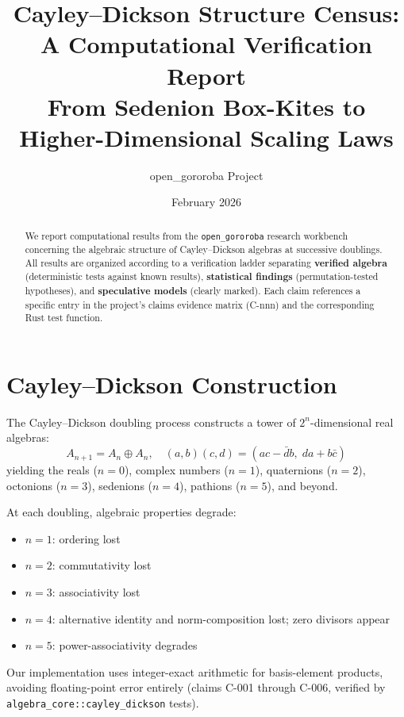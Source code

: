 \documentclass{article}
\title{\textbf{Cayley--Dickson Structure Census: \\
A Computational Verification Report}\\[0.5em]
\large From Sedenion Box-Kites to Higher-Dimensional Scaling Laws}
\author{open\_gororoba Project}
\date{February 2026}
\theoremstyle{definition}
\theoremstyle{plain}
\theoremstyle{remark}
\begin{document}
\maketitle

\begin{abstract}
We report computational results from the \texttt{open\_gororoba} research
workbench concerning the algebraic structure of Cayley--Dickson algebras at
successive doublings.  All results are organized according to a verification
ladder separating \textbf{verified algebra} (deterministic tests against known
results), \textbf{statistical findings} (permutation-tested hypotheses), and
\textbf{speculative models} (clearly marked).  Each claim references a specific
entry in the project's claims evidence matrix (C-nnn) and the corresponding
Rust test function.
\end{abstract}

\tableofcontents
\newpage

\section{Cayley--Dickson Construction}
\label{sec:cd}

The Cayley--Dickson doubling process \cite{baez2002} constructs a tower of
$2^n$-dimensional real algebras:
\begin{equation}
  A_{n+1} = A_n \oplus A_n, \quad
  (a,b)(c,d) = (ac - \bar{d}b,\; da + b\bar{c})
\end{equation}
yielding the reals ($n=0$), complex numbers ($n=1$), quaternions ($n=2$),
octonions ($n=3$), sedenions ($n=4$), pathions ($n=5$), and beyond.

At each doubling, algebraic properties degrade:
\begin{itemize}
  \item $n=1$: ordering lost
  \item $n=2$: commutativity lost
  \item $n=3$: associativity lost
  \item $n=4$: alternative identity and norm-composition lost; zero divisors appear
  \item $n=5$: power-associativity degrades
\end{itemize}

Our implementation uses integer-exact arithmetic for basis-element products,
avoiding floating-point error entirely (claims C-001 through C-006, verified
by \texttt{algebra\_core::cayley\_dickson} tests).
\end{document}
